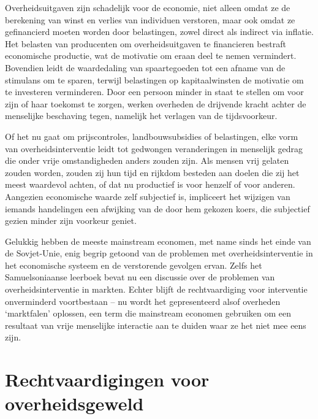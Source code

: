 \documentclass[
  a5paper,
  smalldemyvopaper,11pt,twoside,onecolumn,openright,extrafontsizes,
hidelinks]{memoir}
\begin{document}
Overheidsuitgaven zijn schadelijk voor de economie, niet alleen omdat ze
de berekening van winst en verlies van individuen verstoren, maar ook
omdat ze gefinancierd moeten worden door belastingen, zowel direct als
indirect via inflatie. Het belasten van producenten om overheidsuitgaven
te financieren bestraft economische productie, wat de motivatie om eraan
deel te nemen vermindert. Bovendien leidt de waardedaling van
spaartegoeden tot een afname van de stimulans om te sparen, terwijl
belastingen op kapitaalwinsten de motivatie om te investeren
verminderen. Door een persoon minder in staat te stellen om voor zijn of
haar toekomst te zorgen, werken overheden de drijvende kracht achter de
menselijke beschaving tegen, namelijk het verlagen van de tijdsvoorkeur.

Of het nu gaat om prijscontroles, landbouwsubsidies of belastingen, elke
vorm van overheidsinterventie leidt tot gedwongen veranderingen in
menselijk gedrag die onder vrije omstandigheden anders zouden zijn. Als
mensen vrij gelaten zouden worden, zouden zij hun tijd en rijkdom
besteden aan doelen die zij het meest waardevol achten, of dat nu
productief is voor henzelf of voor anderen. Aangezien economische waarde
zelf subjectief is, impliceert het wijzigen van iemands handelingen een
afwijking van de door hem gekozen koers, die subjectief gezien minder
zijn voorkeur geniet.

Gelukkig hebben de meeste mainstream economen, met name sinds het einde
van de Sovjet-Unie, enig begrip getoond van de problemen met
overheidsinterventie in het economische systeem en de verstorende
gevolgen ervan. Zelfs het Samuelsoniaanse leerboek bevat nu een
discussie over de problemen van overheidsinterventie in markten. Echter
blijft de rechtvaardiging voor interventie onverminderd voortbestaan --
nu wordt het gepresenteerd alsof overheden `marktfalen' oplossen, een
term die mainstream economen gebruiken om een resultaat van vrije
menselijke interactie aan te duiden waar ze het niet mee eens zijn.

\section{Rechtvaardigingen voor
overheidsgeweld}\label{rechtvaardigingen-voor-overheidsgeweld}
\end{document}
